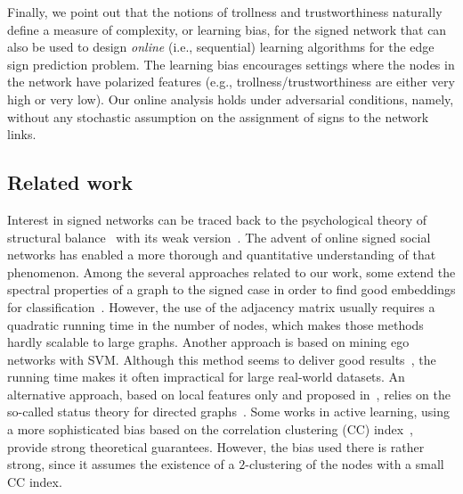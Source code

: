 Finally, we point out that the notions of trollness and trustworthiness naturally define a measure of complexity, or learning bias, for the signed network that can also be used to design {\em online} (i.e., sequential) learning algorithms for the edge sign prediction problem. The learning bias encourages settings where the nodes in the network have polarized features (e.g., trollness/trustworthiness are either very high or very low). Our online analysis holds under adversarial conditions, namely, without any stochastic assumption on the assignment of signs to the network links.







\subsection{Related work}
%
Interest in signed networks can be traced back to the psychological theory of structural balance~\cite{Cartwright56,HeiderBook58} with its weak version~\cite{davis1967clustering}. The advent of online signed social networks has enabled a more thorough and quantitative understanding of that phenomenon. Among the several approaches related to our work, some extend the spectral properties of a graph to the signed case in order to find good embeddings for classification~\cite{Kunegis2009,SignedEmbedding15}. However, the use of the adjacency matrix usually requires a quadratic running time in the number of nodes, which makes those methods hardly scalable to large graphs. Another approach is based on mining ego networks with SVM. Although this method seems to deliver good results~\cite{Papaoikonomou2014}, the running time makes it often impractical for large real-world datasets. An alternative approach, based on local features only and proposed in~\cite{Leskovec2010}, relies on the so-called status theory for directed graphs~\cite{guha2004propagation}. Some works in active learning, using a more sophisticated bias based on the correlation clustering (CC) index~\cite{Cesa-Bianchi2012a,Cesa-Bianchi2012b}, provide strong theoretical guarantees. However, the bias used there is rather strong, since it assumes the existence of a $2$-clustering of the nodes with a small CC index.

